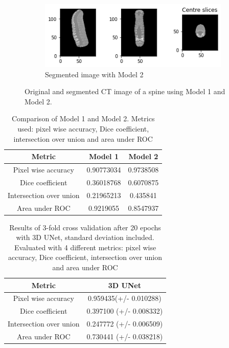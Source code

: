 \begin{figure}[ht!]
\begin{subfigure}[b]{0.70\textwidth}
   \includegraphics[width=1\linewidth]{images/results_1/dice_segmented.png}
   \caption{Segmented image with Model 2}
   \label{fig:Ng5}
\end{subfigure}

\caption[Results of spine segmentation]{Original and segmented CT image of a spine using Model 1 and Model 2.}
\label{fig:spine-segmentations}
\end{figure}


\begin{table}[ht!]
\centering
\begin{tabular}{@{}ccc@{}}
\toprule
Metric                  & Model 1    & Model 2   \\ \midrule
Pixel wise accuracy     & 0.90773034 & 0.9738508 \\
Dice coefficient        & 0.36018768 & 0.6070875 \\
Intersection over union & 0.21965213 & 0.435841  \\
Area under ROC          & 0.9219055  & 0.8547937 \\ \bottomrule
\end{tabular}
\caption[Comparison of Model 1 and 2]{Comparison of Model 1 and Model 2. Metrics used: pixel wise accuracy, Dice coefficient, intersection over union and area under ROC}
\label{tab:results-spine}
\end{table}


\begin{table}[ht!]
\centering
\begin{tabular}{@{}cc@{}}
\toprule
Metric                  & 3D UNet                 \\ \midrule
Pixel wise accuracy     & 0.959435(+/- 0.010288)  \\
Dice coefficient        & 0.397100 (+/- 0.008332) \\
Intersection over union & 0.247772 (+/- 0.006509) \\
Area under ROC          & 0.730441 (+/- 0.038218) \\ \bottomrule
\end{tabular}
\caption[3-fold Cross validation] {Results of 3-fold cross validation after 20 epochs with 3D UNet, standard deviation included. Evaluated with 4 different metrics: pixel wise accuracy, Dice coefficient, intersection over union and area under ROC}
\label{tab:cross-val-spine}
\end{table}

